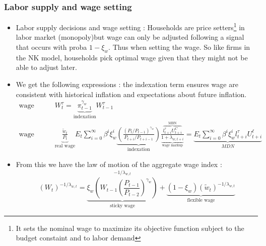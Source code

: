 \documentclass{article}
\begin{document}
\subsubsection{Labor supply and wage setting}
\begin{itemize}
    \item Labor supply decisions and wage setting : Households are price setters\footnote{It sets the nominal wage to maximize its objective function subject to the budget constaint and to labor demand} in labor market (monopoly)but wage can only be adjusted following a signal that occurs with proba $1-\xi_w$. Thus when setting the wage. So like firms in the NK model, households pick optimal wage given that they might not be able to adjust later. 
    \item We get the following expressions : the indexation term ensures wage are consistent with historical inflation and expectations about future inflation. 
    \begin{equation}
    \begin{aligned}
        \text{wage sticks :  }&W_t^\tau = \underbrace{\pi_{t-1}^{\gamma_w}}_{\text{indexation}}W_{t-1}^\tau \\
        \text{wage adjusts : }& \underbrace{\frac{\widetilde{w}_t}{P_t}}_{\text{real wage}} E_t \sum_{i=0}^{\infty} \beta^i \xi_w^i \underbrace{\left( \frac{\left(P_t / P_{t-1}\right)^{\gamma_w}}{P_{t+i} / P_{t+i-1}} \right)}_{\text{indexation}} \frac{\overbrace{l_{t+i}^\tau U_{t+i}^C}^{\text{MBN}}}{\underbrace{1 + \lambda_{w,t+i}}_{\text{wage markup}}}   = \underbrace{E_t \sum_{i=0}^{\infty} \beta^i \xi_w^i l_{t+i}^\tau U_{t+i}^\ell}_{MDN}
    \end{aligned}
    \end{equation}
    \item From this we have the law of motion of the aggregate wage index : 
    \begin{equation}
        (W_t)^{-1/\lambda_{w,t}} = \underbrace{\xi_w \left( W_{t-1} \left( \frac{P_{t-1}}{P_{t-2}} \right)^{\gamma_w} \right)}_{\text{
        sticky wage}}^{-1/\lambda_{w,t}} + \underbrace{(1 - \xi_w)(\tilde{w}_t)^{-1/\lambda_{w,t}} }_{\text{flexible wage}} 
    \end{equation}
\end{itemize}
\end{document}

